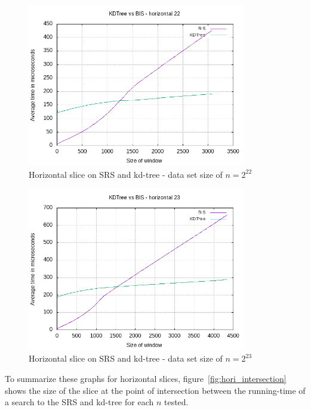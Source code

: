 \begin{figure}[h]
    \centering
    \includegraphics[width = 0.85\textwidth]{pictures/analysis/hori_22.png}
    \caption{Horizontal slice on SRS and kd-tree - data set size of $n=2^{22}$}\label{fig:hori_22}
\end{figure}

\begin{figure}[h]
    \centering
    \includegraphics[width = 0.85\textwidth]{pictures/analysis/hori_23.png}
    \caption{Horizontal slice on SRS and kd-tree - data set size of $n=2^{23}$}\label{fig:hori_23}
\end{figure}


To summarize these graphs for horizontal slices, figure~\ref{fig:hori_intersection} shows the size of the slice at the point of intersection between the running-time of a search to the SRS and kd-tree for each $n$ tested.

